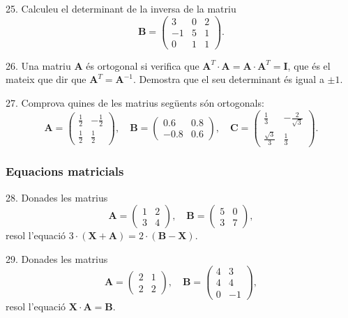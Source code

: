 \documentclass[12pt]{article}
\newcommand{\mat}[1]{\mathbf{#1}}
\begin{document}
\begin{exercici}
25. Calculeu el determinant de la inversa de la matriu 
\[
\mat{B} = 
\begin{pmatrix}
3 & 0 & 2 \\
-1 & 5 & 1 \\
0 & 1 & 1
\end{pmatrix}.
\]
\end{exercici}

\begin{exercici}
26. Una matriu $\mat{A}$ és ortogonal si verifica que $\mat{A}^T \cdot \mat{A} = \mat{A} \cdot \mat{A}^T = \mat{I}$, que és el mateix que dir que $\mat{A}^T = \mat{A}^{-1}$. Demostra que el seu determinant és igual a $\pm 1$.
\end{exercici}

\begin{exercici}
27. Comprova quines de les matrius següents són ortogonals:
\[
\mat{A} = 
\begin{pmatrix}
\frac{1}{2} & -\frac{1}{2} \\
\frac{1}{2} & \frac{1}{2}
\end{pmatrix}, \quad 
\mat{B} = 
\begin{pmatrix}
0.6 & 0.8 \\
-0.8 & 0.6
\end{pmatrix}, \quad 
\mat{C} = 
\begin{pmatrix}
\frac{1}{3} & -\frac{2}{\sqrt{3}} \\
\frac{\sqrt{3}}{3} & \frac{1}{3}
\end{pmatrix}.
\]
\end{exercici}

\subsubsection{Equacions matricials}
\begin{exercici}
28. Donades les matrius 
\[
\mat{A} = 
\begin{pmatrix}
1 & 2 \\
3 & 4
\end{pmatrix}, \quad 
\mat{B} = 
\begin{pmatrix}
5 & 0 \\
3 & 7
\end{pmatrix},
\]
resol l'equació $3 \cdot (\mat{X} + \mat{A}) = 2 \cdot (\mat{B} - \mat{X})$.
\end{exercici}

\begin{exercici}
29. Donades les matrius 
\[
\mat{A} = 
\begin{pmatrix}
2 & 1 \\
2 & 2
\end{pmatrix}, \quad 
\mat{B} = 
\begin{pmatrix}
4 & 3 \\
4 & 4 \\
0 & -1
\end{pmatrix},
\]
resol l'equació $\mat{X} \cdot \mat{A} = \mat{B}$.
\end{exercici}
\end{document}
